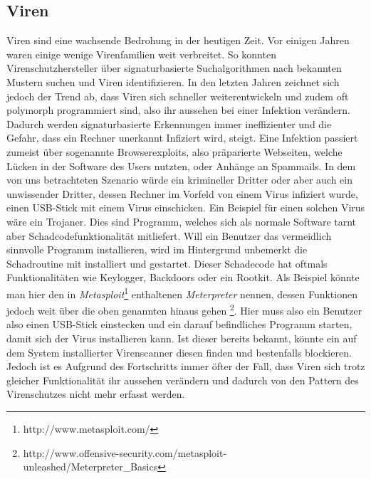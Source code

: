 \subsection{Viren}
Viren sind eine wachsende Bedrohung in der heutigen Zeit. Vor einigen Jahren waren einige wenige Virenfamilien weit verbreitet. So konnten Virenschutzhersteller über signaturbasierte Suchalgorithmen nach bekannten Mustern suchen und Viren identifizieren. In den letzten Jahren zeichnet sich jedoch der Trend ab, dass Viren sich schneller weiterentwickeln und zudem oft polymorph programmiert sind, also ihr aussehen bei einer Infektion verändern. Dadurch werden signaturbasierte Erkennungen immer ineffizienter und die Gefahr, dass ein Rechner unerkannt Infiziert wird, steigt. Eine Infektion passiert zumeist über sogenannte Browserexploits, also präparierte Webseiten, welche Lücken in der Software des Users nutzten, oder Anhänge an Spammails. In dem von uns betrachteten Szenario würde ein krimineller Dritter oder aber auch ein unwissender Dritter, dessen Rechner im Vorfeld von einem Virus infiziert wurde, einen USB-Stick mit einem Virus einschicken. Ein Beispiel für einen solchen Virus wäre ein Trojaner. Dies sind Programm, welches sich als normale Software tarnt aber Schadcodefunktionalität mitliefert. \cite{Stamp2006} Will ein Benutzer das vermeidlich sinnvolle Programm installieren, wird im Hintergrund unbemerkt die Schadroutine mit installiert und gestartet. Dieser Schadecode hat oftmals Funktionalitäten wie Keylogger, Backdoors oder ein Rootkit. Als Beispiel könnte man hier den in \textit{Metasploit}\footnote{http://www.metasploit.com/} enthaltenen \textit{Meterpreter} nennen, dessen Funktionen jedoch weit über die oben genannten hinaus gehen \footnote{http://www.offensive-security.com/metasploit-unleashed/Meterpreter\_Basics}. Hier muss also ein Benutzer also einen USB-Stick einstecken und ein darauf befindliches Programm starten, damit sich der Virus installieren kann. Ist dieser bereits bekannt, könnte ein auf dem System installierter Virenscanner diesen finden und bestenfalls blockieren. Jedoch ist es Aufgrund des Fortschritts immer öfter der Fall, dass Viren sich trotz gleicher Funktionalität ihr aussehen verändern und dadurch von den Pattern des Virenschutzes nicht mehr erfasst werden.
			
